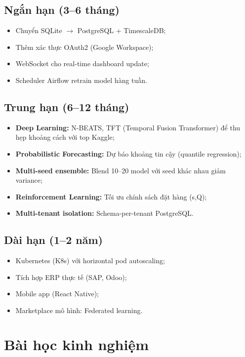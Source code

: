\documentclass[12pt,a4paper]{report}
\begin{document}
\subsection{Ngắn hạn (3--6 tháng)}

\begin{itemize}
    \item Chuyển SQLite $\rightarrow$ PostgreSQL + TimescaleDB;
    \item Thêm xác thực OAuth2 (Google Workspace);
    \item WebSocket cho real-time dashboard update;
    \item Scheduler Airflow retrain model hàng tuần.
\end{itemize}

\subsection{Trung hạn (6--12 tháng)}

\begin{itemize}
    \item \textbf{Deep Learning:} N-BEATS, TFT (Temporal Fusion Transformer) để thu hẹp khoảng cách với top Kaggle;
    \item \textbf{Probabilistic Forecasting:} Dự báo khoảng tin cậy (quantile regression);
    \item \textbf{Multi-seed ensemble:} Blend 10--20 model với seed khác nhau giảm variance;
    \item \textbf{Reinforcement Learning:} Tối ưu chính sách đặt hàng (s,Q);
    \item \textbf{Multi-tenant isolation:} Schema-per-tenant PostgreSQL.
\end{itemize}

\subsection{Dài hạn (1--2 năm)}

\begin{itemize}
    \item Kubernetes (K8s) với horizontal pod autoscaling;
    \item Tích hợp ERP thực tế (SAP, Odoo);
    \item Mobile app (React Native);
    \item Marketplace mô hình: Federated learning.
\end{itemize}

\section{Bài học kinh nghiệm}
\end{document}
